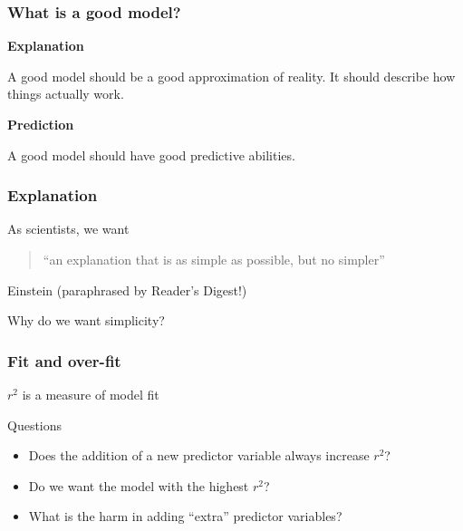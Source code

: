 \documentclass[color=usenames,dvipsnames]{beamer}\usepackage[]{graphicx}\usepackage[]{color}
\begin{document}
\begin{frame}
  \frametitle{What is a good model?}
  {\bf Explanation \par}
  A good model should be a good approximation of reality. It should
  describe how things actually work. \\
  \pause
  \vspace{0.5cm}
  {\bf Prediction \par}
  A good model should have good predictive abilities. 
\end{frame}



\begin{frame}
  \frametitle{Explanation}
  \large
As scientists, we want
\begin{quote}
  ``an explanation that is as simple as possible, but no simpler''
\end{quote}
{\small \flushright Einstein (paraphrased by Reader's Digest!) \par}
\pause
\vspace{1cm}
Why do we want simplicity? %
\end{frame}




\begin{frame}
  \frametitle{Fit and over-fit}
  \large
  {$r^2$ is a measure of model fit \par}
  \vspace{1cm}
  \pause
  {Questions}
  \begin{itemize}%
    \item<2-> Does the addition of a new predictor variable always
      increase $r^2$?
    \item<3-> Do we want the model with the highest $r^2$?
    \item<4-> What is the harm in adding ``extra'' predictor variables?
  \end{itemize}
  \vfill
\end{frame}
\end{document}
